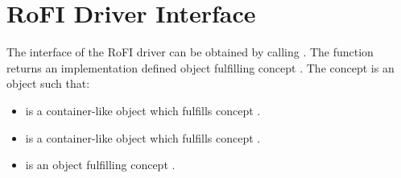 \chapter{RoFI Driver Interface}\label{chap:rofi_interface}

The interface of the RoFI driver can be obtained by calling
. The
function returns an implementation defined object fulfilling concept
. The  concept is an object such that:
\begin{itemize}
    \item {} is a container-like object which
     fulfills concept .
    \item {} is a container-like object which
     fulfills concept .
    \item {} is an object fulfilling concept .
\end{itemize}

